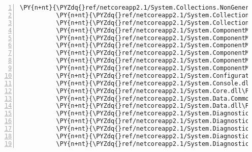 \begin{Verbatim}[commandchars=\\\{\},numbers=left,firstnumber=1,stepnumber=1,numberblanklines=0]
          \PY{n+nt}{\PYZdq{}ref/netcoreapp2.1/System.Collections.NonGeneric.dll\PYZdq{}}\PY{p}{:} \PY{p}{\PYZob{}}\PY{p}{\PYZcb{}}\PY{p}{,}
          \PY{n+nt}{\PYZdq{}ref/netcoreapp2.1/System.Collections.Specialized.dll\PYZdq{}}\PY{p}{:} \PY{p}{\PYZob{}}\PY{p}{\PYZcb{}}\PY{p}{,}
          \PY{n+nt}{\PYZdq{}ref/netcoreapp2.1/System.Collections.dll\PYZdq{}}\PY{p}{:} \PY{p}{\PYZob{}}\PY{p}{\PYZcb{}}\PY{p}{,}
          \PY{n+nt}{\PYZdq{}ref/netcoreapp2.1/System.ComponentModel.Annotations.dll\PYZdq{}}\PY{p}{:} \PY{p}{\PYZob{}}\PY{p}{\PYZcb{}}\PY{p}{,}
          \PY{n+nt}{\PYZdq{}ref/netcoreapp2.1/System.ComponentModel.DataAnnotations.dll\PYZdq{}}\PY{p}{:} \PY{p}{\PYZob{}}\PY{p}{\PYZcb{}}\PY{p}{,}
          \PY{n+nt}{\PYZdq{}ref/netcoreapp2.1/System.ComponentModel.EventBasedAsync.dll\PYZdq{}}\PY{p}{:} \PY{p}{\PYZob{}}\PY{p}{\PYZcb{}}\PY{p}{,}
          \PY{n+nt}{\PYZdq{}ref/netcoreapp2.1/System.ComponentModel.Primitives.dll\PYZdq{}}\PY{p}{:} \PY{p}{\PYZob{}}\PY{p}{\PYZcb{}}\PY{p}{,}
          \PY{n+nt}{\PYZdq{}ref/netcoreapp2.1/System.ComponentModel.TypeConverter.dll\PYZdq{}}\PY{p}{:} \PY{p}{\PYZob{}}\PY{p}{\PYZcb{}}\PY{p}{,}
          \PY{n+nt}{\PYZdq{}ref/netcoreapp2.1/System.ComponentModel.dll\PYZdq{}}\PY{p}{:} \PY{p}{\PYZob{}}\PY{p}{\PYZcb{}}\PY{p}{,}
          \PY{n+nt}{\PYZdq{}ref/netcoreapp2.1/System.Configuration.dll\PYZdq{}}\PY{p}{:} \PY{p}{\PYZob{}}\PY{p}{\PYZcb{}}\PY{p}{,}
          \PY{n+nt}{\PYZdq{}ref/netcoreapp2.1/System.Console.dll\PYZdq{}}\PY{p}{:} \PY{p}{\PYZob{}}\PY{p}{\PYZcb{}}\PY{p}{,}
          \PY{n+nt}{\PYZdq{}ref/netcoreapp2.1/System.Core.dll\PYZdq{}}\PY{p}{:} \PY{p}{\PYZob{}}\PY{p}{\PYZcb{}}\PY{p}{,}
          \PY{n+nt}{\PYZdq{}ref/netcoreapp2.1/System.Data.Common.dll\PYZdq{}}\PY{p}{:} \PY{p}{\PYZob{}}\PY{p}{\PYZcb{}}\PY{p}{,}
          \PY{n+nt}{\PYZdq{}ref/netcoreapp2.1/System.Data.dll\PYZdq{}}\PY{p}{:} \PY{p}{\PYZob{}}\PY{p}{\PYZcb{}}\PY{p}{,}
          \PY{n+nt}{\PYZdq{}ref/netcoreapp2.1/System.Diagnostics.Contracts.dll\PYZdq{}}\PY{p}{:} \PY{p}{\PYZob{}}\PY{p}{\PYZcb{}}\PY{p}{,}
          \PY{n+nt}{\PYZdq{}ref/netcoreapp2.1/System.Diagnostics.Debug.dll\PYZdq{}}\PY{p}{:} \PY{p}{\PYZob{}}\PY{p}{\PYZcb{}}\PY{p}{,}
          \PY{n+nt}{\PYZdq{}ref/netcoreapp2.1/System.Diagnostics.DiagnosticSource.dll\PYZdq{}}\PY{p}{:} \PY{p}{\PYZob{}}\PY{p}{\PYZcb{}}\PY{p}{,}
          \PY{n+nt}{\PYZdq{}ref/netcoreapp2.1/System.Diagnostics.FileVersionInfo.dll\PYZdq{}}\PY{p}{:} \PY{p}{\PYZob{}}\PY{p}{\PYZcb{}}\PY{p}{,}
          \PY{n+nt}{\PYZdq{}ref/netcoreapp2.1/System.Diagnostics.Process.dll\PYZdq{}}\PY{p}{:} \PY{p}{\PYZob{}}\PY{p}{\PYZcb{}}\PY{p}{,}

\end{Verbatim}
